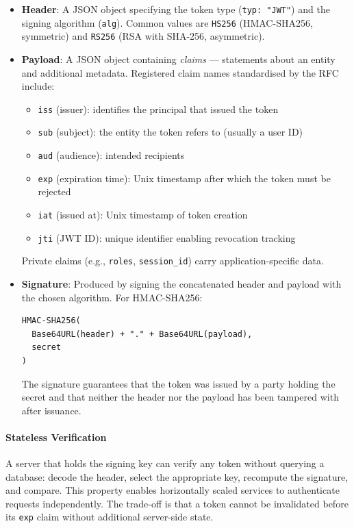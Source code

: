 \begin{itemize}
    \item \textbf{Header}: A JSON object specifying the token type (\texttt{typ: "JWT"}) and the signing algorithm (\texttt{alg}). Common values are \texttt{HS256} (HMAC-SHA256, symmetric) and \texttt{RS256} (RSA with SHA-256, asymmetric).

    \item \textbf{Payload}: A JSON object containing \emph{claims} — statements about an entity and additional metadata. Registered claim names standardised by the RFC include:
    \begin{itemize}
        \item \texttt{iss} (issuer): identifies the principal that issued the token
        \item \texttt{sub} (subject): the entity the token refers to (usually a user ID)
        \item \texttt{aud} (audience): intended recipients
        \item \texttt{exp} (expiration time): Unix timestamp after which the token must be rejected
        \item \texttt{iat} (issued at): Unix timestamp of token creation
        \item \texttt{jti} (JWT ID): unique identifier enabling revocation tracking
    \end{itemize}
    Private claims (e.g., \texttt{roles}, \texttt{session\_id}) carry application-specific data.

    \item \textbf{Signature}: Produced by signing the concatenated header and payload with the chosen algorithm. For HMAC-SHA256:
    \begin{verbatim}
HMAC-SHA256(
  Base64URL(header) + "." + Base64URL(payload),
  secret
)
    \end{verbatim}
    The signature guarantees that the token was issued by a party holding the secret and that neither the header nor the payload has been tampered with after issuance.
\end{itemize}

\paragraph{Stateless Verification}

A server that holds the signing key can verify any token without querying a database: decode the header, select the appropriate key, recompute the signature, and compare. This property enables horizontally scaled services to authenticate requests independently. The trade-off is that a token cannot be invalidated before its \texttt{exp} claim without additional server-side state.

